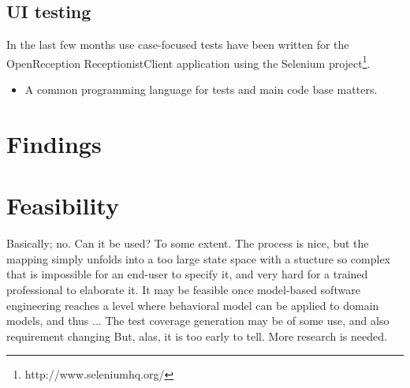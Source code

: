 \subsection{UI testing}
In the last few months use case-focused tests have been written for the OpenReception ReceptionistClient application using the Selenium project\footnote{http://www.seleniumhq.org/}.

\begin{itemize}
  \item A common programming language for tests and main code base matters.
\end{itemize}

\section{Findings}

\section{Feasibility}
Basically; no. Can it be used? To some extent. The process is nice, but the mapping simply unfolds into a too large state space with a stucture so complex that is impossible for an end-user to specify it, and very hard for a trained professional to elaborate it. It may be feasible once model-based software engineering reaches a level where behavioral model can be applied to domain models, and thus ...
The test coverage generation may be of some use, and also requirement changing
But, alas, it is too early to tell. More research is needed.
